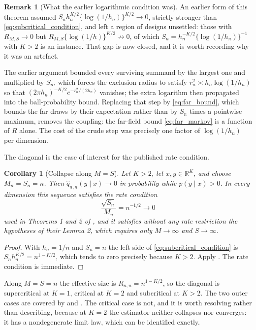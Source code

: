 \documentclass[11pt]{article}
\newtheorem{corollary}[corollary]{Corollary}
\theoremstyle{definition}
\newtheorem{remark}[remark]{Remark}
\newcommand{\R}{\mathbb{R}}
\begin{document}
\begin{remark}[What the earlier logarithmic condition was]\label{rem:log_gap}
An earlier form of this theorem assumed $S_nh_n^{K/2}\{\log(1/h_n)\}^{K/2}\to0$, strictly stronger than \eqref{eq:subcritical_condition}, and left a region of designs unsettled: those with $R_{M,S}\to0$ but $R_{M,S}\{\log(1/h)\}^{K/2}\not\to0$, of which $S_n=h_n^{-K/2}\{\log(1/h_n)\}^{-1}$ with $K>2$ is an instance. That gap is now closed, and it is worth recording why it was an artefact.

The earlier argument bounded every surviving summand by the largest one and multiplied by $S_n$, which forces the exclusion radius to satisfy $r_n^2\asymp h_n\log(1/h_n)$ so that $(2\pi h_n)^{-K/2}e^{-r_n^2/(2h_n)}$ vanishes; the extra logarithm then propagated into the ball-probability bound. Replacing that step by \eqref{eq:far_bound}, which bounds the far draws by their expectation rather than by $S_n$ times a pointwise maximum, removes the coupling: the far-field bound \eqref{eq:far_markov} is a function of $R$ alone. The cost of the crude step was precisely one factor of $\log(1/h_n)$ per dimension.
\end{remark}

The diagonal is the case of interest for the published rate condition.

\begin{corollary}[Collapse along $M=S$]\label{thm:collapse}
Let $K>2$, let $x,y\in\R^K$, and choose $M_n=S_n=n$. Then $\widehat q_{n,n}(y\mid x)\to0$ in probability while $p(y\mid x)>0$. In every dimension this sequence satisfies the rate condition
\[
\frac{\sqrt{S_n}}{M_n}=n^{-1/2}\longrightarrow0
\]
used in Theorems 1 and 2 of \citet{BrandtSantaClara2002}, and it satisfies without any rate restriction the hypotheses of their Lemma 2, which requires only $M\to\infty$ and $S\to\infty$.
\end{corollary}

\begin{proof}
With $h_n=1/n$ and $S_n=n$ the left side of \eqref{eq:subcritical_condition} is $S_nh_n^{K/2}=n^{1-K/2}$, which tends to zero precisely because $K>2$. Apply . The rate condition is immediate.
\end{proof}

Along $M=S=n$ the effective size is $R_{n,n}=n^{1-K/2}$, so the diagonal is supercritical at $K=1$, critical at $K=2$ and subcritical at $K>2$. The two outer cases are covered by  and . The critical case is not, and it is worth resolving rather than describing, because at $K=2$ the estimator neither collapses nor converges: it has a nondegenerate limit law, which can be identified exactly.
\end{document}
